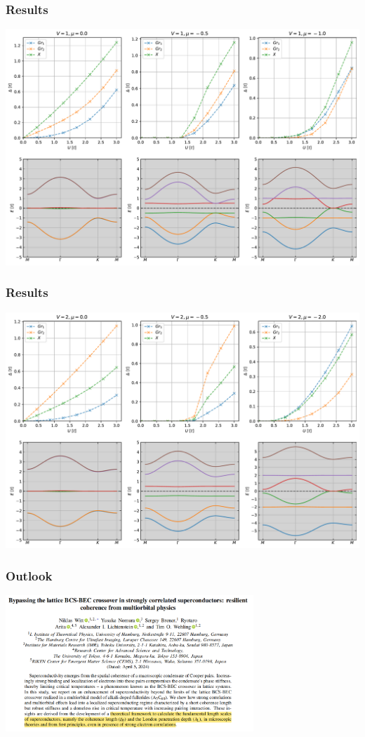 \documentclass[aspectratio=169]{beamer}
\begin{document}
\begin{frame}[t]
	\frametitle{Results}
	
	\begin{center}
		\includegraphics[width=0.65\linewidth]{figs/gap_size_vs_U_egx_uniform_U_V_1}
	\end{center}
\end{frame}

\begin{frame}[t]
	\frametitle{Results}
	
	\begin{center}
		\includegraphics[width=0.65\linewidth]{figs/gap_size_vs_U_egx_uniform_U_V_2}
	\end{center}
\end{frame}


	

\begin{frame}
	\frametitle{Outlook}
	
	\pause
	\begin{center}
		\includegraphics[width=0.7\textwidth]{figs/Witt 2024 Paper Screenshot}
	\end{center}
\end{frame}
\end{document}
